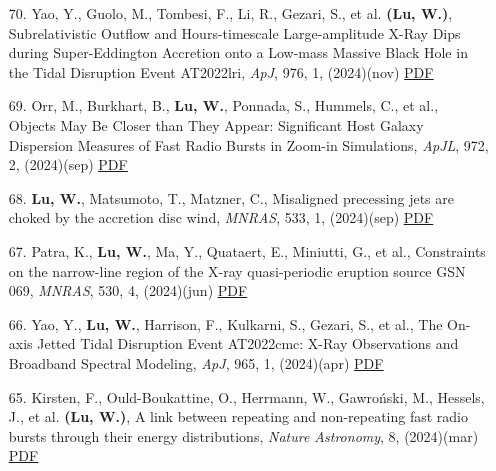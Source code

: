 \begin{itemize}[leftmargin=0.65cm]
\vspace{-0.1cm}
\item[70.]{Yao, Y., Guolo, M., Tombesi, F., Li, R., Gezari, S., et al. {\bf (Lu, W.)}, {Subrelativistic Outflow and Hours-timescale Large-amplitude X-Ray Dips during Super-Eddington Accretion onto a Low-mass Massive Black Hole in the Tidal Disruption Event AT2022lri}, {\it ApJ}, 976, 1, (2024)(nov) \href{https://ui.adsabs.harvard.edu/abs/2024ApJ...976...34Y}{\underline{PDF}}}

\vspace{-0.1cm}
\item[69.]{Orr, M., Burkhart, B., {\bf Lu, W.}, Ponnada, S., Hummels, C., et al., {Objects May Be Closer than They Appear: Significant Host Galaxy Dispersion Measures of Fast Radio Bursts in Zoom-in Simulations}, {\it ApJL}, 972, 2, (2024)(sep) \href{https://ui.adsabs.harvard.edu/abs/2024ApJ...972L..26O}{\underline{PDF}}}

\vspace{-0.1cm}
\item[68.]{{\bf Lu, W.}, Matsumoto, T., Matzner, C., {Misaligned precessing jets are choked by the accretion disc wind}, {\it MNRAS}, 533, 1, (2024)(sep) \href{https://ui.adsabs.harvard.edu/abs/2024MNRAS.533..979L}{\underline{PDF}}}

\vspace{-0.1cm}
\item[67.]{Patra, K., {\bf Lu, W.}, Ma, Y., Quataert, E., Miniutti, G., et al., {Constraints on the narrow-line region of the X-ray quasi-periodic eruption source GSN 069}, {\it MNRAS}, 530, 4, (2024)(jun) \href{https://ui.adsabs.harvard.edu/abs/2024MNRAS.530.5120P}{\underline{PDF}}}

\vspace{-0.1cm}
\item[66.]{Yao, Y., {\bf Lu, W.}, Harrison, F., Kulkarni, S., Gezari, S., et al., {The On-axis Jetted Tidal Disruption Event AT2022cmc: X-Ray Observations and Broadband Spectral Modeling}, {\it ApJ}, 965, 1, (2024)(apr) \href{https://ui.adsabs.harvard.edu/abs/2024ApJ...965...39Y}{\underline{PDF}}}

\vspace{-0.1cm}
\item[65.]{Kirsten, F., Ould-Boukattine, O., Herrmann, W., Gawro{\'n}ski, M., Hessels, J., et al. {\bf (Lu, W.)}, {A link between repeating and non-repeating fast radio bursts through their energy distributions}, {\it Nature Astronomy}, 8, (2024)(mar) \href{https://ui.adsabs.harvard.edu/abs/2024NatAs...8..337K}{\underline{PDF}}}


\end{itemize}
